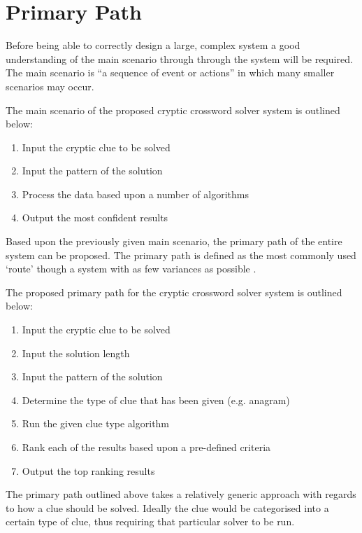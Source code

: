 \section{Primary Path}
\label{sec:primary_path}

Before being able to correctly design a large, complex system a good 
understanding of the main scenario through through the system will be required.
The main scenario is ``a sequence of event or actions'' \citep{lunn03} in which
many smaller scenarios may occur.

The main scenario of the proposed cryptic crossword solver system is outlined 
below:

\begin{enumerate}
  \item Input the cryptic clue to be solved
  \item Input the pattern of the solution
  \item Process the data based upon a number of algorithms
  \item Output the most confident results
\end{enumerate}

Based upon the previously given main scenario, the primary path of the entire 
system can be proposed. The primary path is defined as the most commonly used 
`route' though a system with as few variances as possible \citep{lunn03}.

The proposed primary path for the cryptic crossword solver system is outlined 
below:

\begin{enumerate}
  \item Input the cryptic clue to be solved
  \item Input the solution length
  \item Input the pattern of the solution
  \item Determine the type of clue that has been given (e.g. anagram)
  \item Run the given clue type algorithm 
  \item Rank each of the results based upon a pre-defined criteria
  \item Output the top ranking results
\end{enumerate}

The primary path outlined above takes a relatively generic approach with regards
to how a clue should be solved. Ideally the clue would be categorised into a 
certain type of clue, thus requiring that particular solver to be run.

